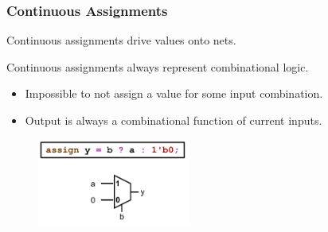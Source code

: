 \documentclass[t, notes, xcolor=table]{beamer}
\begin{document}
\begin{frame}
\frametitle{Continuous Assignments}
Continuous assignments drive values onto nets.
\newline

Continuous assignments always represent combinational logic.
\begin{itemize}
\item Impossible to not assign a value for some input combination.
\item Output is always a combinational function of current inputs.
\end{itemize}
\vspace{10pt}
\begin{figure}
    \includegraphics[width=0.45\textwidth]{img/13_cont_assign.png}
\end{figure}
\end{frame}
\end{document}
